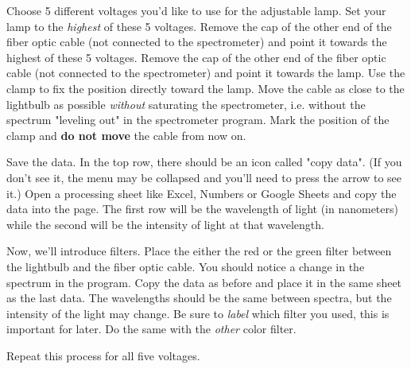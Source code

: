Choose 5 different voltages you'd like to use for the adjustable lamp.  Set
your lamp to the \emph{highest} of these 5 voltages.  Remove the cap of the
other end of the fiber optic cable (not connected to the spectrometer) and
point it towards the highest of these 5 voltages.  Remove the cap of the other
end of the fiber optic cable (not connected to the spectrometer) and point it
towards the lamp. Use the clamp to fix the position directly toward the lamp.
Move the cable as close to the lightbulb as possible \emph{without} saturating
the spectrometer, i.e. without the spectrum "leveling out" in the spectrometer
program. Mark the position of the clamp and \textbf{do not move} the cable from
now on.

Save the data. In the top row, there should be an icon called "copy data". (If
you don't see it, the menu may be collapsed and you'll need to press the arrow
to see it.) Open a processing sheet like Excel, Numbers or Google Sheets and
copy the data into the page. The first row will be the wavelength of light (in
nanometers) while the second will be the intensity of light at that wavelength.

Now, we'll introduce filters. Place the either the red or the green filter
between the lightbulb and the fiber optic cable. You should notice a change in
the spectrum in the program. Copy the data as before and place it in the same
sheet as the last data. The wavelengths should be the same between spectra, but
the intensity of the light may change. Be sure to \emph{label} which filter you
used, this is important for later. Do the same with the \emph{other} color
filter.

Repeat this process for all five voltages.

\noindent
{}
\hspace{0.3cm}
\vspace{0.2cm}

\noindent
{}
\hspace{0.3cm}
\vspace{0.2cm}

